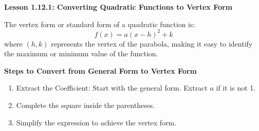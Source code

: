 \begin{center}
\textbf{Lesson 1.12.1: Converting Quadratic Functions to Vertex Form}
\end{center}

\vspace*{1ex}

The vertex form or standard form of a quadratic function is:
\[ f(x) = a(x-h)^2 + k \]
where \((h, k)\) represents the vertex of the parabola, making it easy to identify the maximum or minimum value of the function.

\textbf{Steps to Convert from General Form to Vertex Form}
\begin{enumerate}[label = \color{blue}\arabic*. ]
\item Extract the Coefficient: Start with the general form. 
Extract \( a \) if it is not 1. 
\item Complete the square inside the parentheses. 
\item Simplify the expression to achieve the vertex form. 
\end{enumerate}


